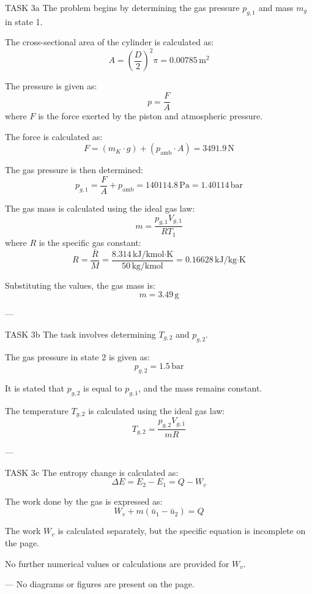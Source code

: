 TASK 3a  
The problem begins by determining the gas pressure \( p_{g,1} \) and mass \( m_g \) in state 1.  

The cross-sectional area of the cylinder is calculated as:  
\[
A = \left(\frac{D}{2}\right)^2 \pi = 0.00785 \, \text{m}^2
\]  

The pressure is given as:  
\[
p = \frac{F}{A}
\]  
where \( F \) is the force exerted by the piston and atmospheric pressure.  

The force is calculated as:  
\[
F = (m_K \cdot g) + (p_{\text{amb}} \cdot A) = 3491.9 \, \text{N}
\]  

The gas pressure is then determined:  
\[
p_{g,1} = \frac{F}{A} + p_{\text{amb}} = 140114.8 \, \text{Pa} = 1.40114 \, \text{bar}
\]  

The gas mass is calculated using the ideal gas law:  
\[
m = \frac{p_{g,1} V_{g,1}}{R T_1}
\]  
where \( R \) is the specific gas constant:  
\[
R = \frac{\bar{R}}{M} = \frac{8.314 \, \text{kJ/kmol·K}}{50 \, \text{kg/kmol}} = 0.16628 \, \text{kJ/kg·K}
\]  

Substituting the values, the gas mass is:  
\[
m = 3.49 \, \text{g}
\]  

---

TASK 3b  
The task involves determining \( T_{g,2} \) and \( p_{g,2} \).  

The gas pressure in state 2 is given as:  
\[
p_{g,2} = 1.5 \, \text{bar}
\]  

It is stated that \( p_{g,2} \) is equal to \( p_{g,1} \), and the mass remains constant.  

The temperature \( T_{g,2} \) is calculated using the ideal gas law:  
\[
T_{g,2} = \frac{p_{g,2} V_{g,1}}{m R}
\]  

---

TASK 3c  
The entropy change is calculated as:  
\[
\Delta E = E_2 - E_1 = Q - W_v
\]  

The work done by the gas is expressed as:  
\[
W_v + m (\bar{u}_1 - \bar{u}_2) = Q
\]  

The work \( W_v \) is calculated separately, but the specific equation is incomplete on the page.  

No further numerical values or calculations are provided for \( W_v \).  

---  
No diagrams or figures are present on the page.